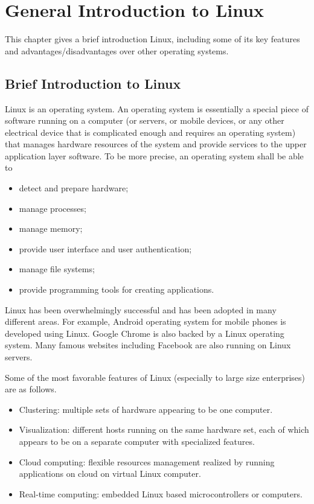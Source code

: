 \chapter{General Introduction to Linux}

This chapter gives a brief introduction Linux, including some of its key features and advantages/disadvantages over other operating systems.

\section{Brief Introduction to Linux}

Linux is an operating system. An operating system is essentially a special piece of software running on a computer (or servers, or mobile devices, or any other electrical device that is complicated enough and requires an operating system) that manages hardware resources of the system and provide services to the upper application layer software. To be more precise, an operating system shall be able to
\begin{itemize}
  \item detect and prepare hardware;
  \item manage processes;
  \item manage memory;
  \item provide user interface and user authentication;
  \item manage file systems;
  \item provide programming tools for creating applications.
\end{itemize}

Linux has been overwhelmingly successful and has been adopted in many different areas. For example, Android operating system for mobile phones is developed using Linux. Google Chrome is also backed by a Linux operating system. Many famous websites including Facebook are also running on Linux servers.

Some of the most favorable features of Linux (especially to large size enterprises) are as follows.
\begin{itemize}
  \item Clustering: multiple sets of hardware appearing to be one computer.
  \item Visualization: different hosts running on the same hardware set, each of which appears to be on a separate computer with specialized features.
  \item Cloud computing: flexible resources management realized by running applications on cloud on virtual Linux computer.
  \item Real-time computing: embedded Linux based microcontrollers or computers.
\end{itemize}


